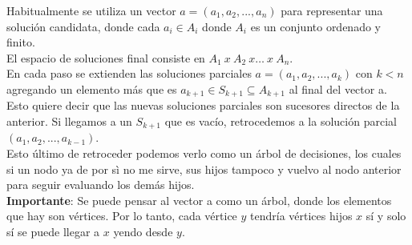 \documentclass[10pt,a4paper]{article}
\begin{document}
Habitualmente se utiliza un vector $ a = (a_{1}, a_{2}, ..., a_{n})$ para representar una solución candidata, donde cada $a_{i} \in A_{i}$ donde $A_{i}$ es un conjunto ordenado y finito.  \\

El espacio de soluciones final consiste en $ A_{1} \ x \ A_{2} \ x \dots \ x \ A_{n} $. \\

En cada paso se extienden las soluciones parciales $a = (a_{1}, a_{2}, ..., a_{k})$ con $k<n$ agregando un elemento más que es $a_{k+1} \in S_{k+1} \subseteq A_{k+1}$ al final del vector a. Esto quiere decir que las nuevas soluciones parciales son sucesores directos de la anterior. Si llegamos a un $S_{k+1}$ que es vacío, retrocedemos a la solución parcial $(a_{1}, a_{2}, ..., a_{k-1})$. \\

Esto último de retroceder podemos verlo como un árbol de decisiones, los cuales si un nodo ya de por sì no me sirve, sus hijos tampoco y vuelvo al nodo anterior para seguir evaluando los demás hijos. \\

\textbf{Importante}: Se puede pensar al vector a como un árbol, donde los elementos que hay son vértices. Por lo tanto, cada vértice $y$ tendría vértices hijos $x$ sí y solo sí se puede llegar a $x$ yendo desde $y$.
\end{document}

